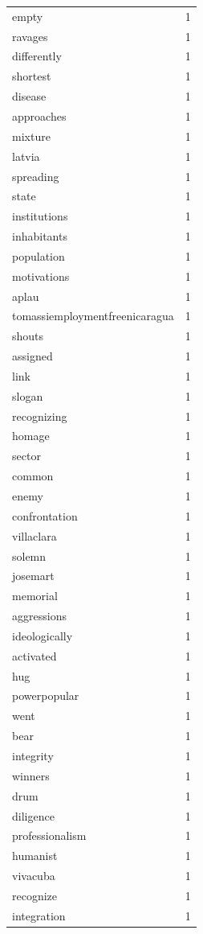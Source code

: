 \begin{tabular}{lr}
empty & 1 \\
ravages & 1 \\
differently & 1 \\
shortest & 1 \\
disease & 1 \\
approaches & 1 \\
mixture & 1 \\
latvia & 1 \\
spreading & 1 \\
state & 1 \\
institutions & 1 \\
inhabitants & 1 \\
population & 1 \\
motivations & 1 \\
aplau & 1 \\
tomassiemploymentfreenicaragua & 1 \\
shouts & 1 \\
assigned & 1 \\
link & 1 \\
slogan & 1 \\
recognizing & 1 \\
homage & 1 \\
sector & 1 \\
common & 1 \\
enemy & 1 \\
confrontation & 1 \\
villaclara & 1 \\
solemn & 1 \\
josemart & 1 \\
memorial & 1 \\
aggressions & 1 \\
ideologically & 1 \\
activated & 1 \\
hug & 1 \\
powerpopular & 1 \\
went & 1 \\
bear & 1 \\
integrity & 1 \\
winners & 1 \\
drum & 1 \\
diligence & 1 \\
professionalism & 1 \\
humanist & 1 \\
vivacuba & 1 \\
recognize & 1 \\
integration & 1 \\

\end{tabular}

